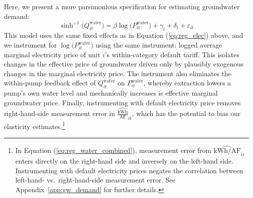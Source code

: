Here, we present a more parsimonious specification for estimating groundwater demand: 
\begin{equation}
\sinh^{-1}\big(Q^{\text{water}}_{it}\big) = \beta\log\big({P}^{\text{water}}_{it}\big) + \gamma_{i} + \delta_t + \varepsilon_{it} \label{eq:reg_water_combined} 
\end{equation}
This model uses the same fixed effects as in Equation (\ref{eq:reg_elec}) above, and we instrument for $\log\big({P}^{\text{water}}_{it}\big)$ using the same instrument: logged average marginal electricity price of unit $i$'s within-category default tariff. This isolates changes in the effective price of groundwater driven only by plausibly exogenous changes in the marginal electricity price. The instrument also eliminates the within-pump feedback effect of $Q^{\text{water}}_{it}$ on $P^{\text{water}}_{it}$, whereby extraction lowers a pump's own water level and mechanically increases is effective marginal groundwater price. Finally, instrumenting with default electricity price removes right-hand-side measurement error in $\widehat{\tfrac{{\text{kWh}}}{\text{AF}}}_{it}$, which has the potential to bias our elasticity estimates.\footnote{
In Equation (\ref{eq:reg_water_combined}), measurement error from $\widehat{{{\text{kWh}}}\big/{\text{AF}}}_{it}$ enters directly on the right-hand side and inversely on the left-hand side.  
Instrumenting with default electricity prices negates the correlation between left-hand- vs.\ right-hand-side measurement error. See Appendix~\ref{app:gw_demand} for further details.}


